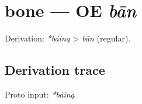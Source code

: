 \documentclass[
  british,
  a4paper,
  openany]{book}
\providecommand{\texorpdfstring}[2]{#1}
\begin{document}
\section{\texorpdfstring{bone --- OE
\emph{bān}}{bone --- OE bān}}\label{bone-oe-bux101n}


Derivation: \emph{*báiną} \textgreater{} \emph{bān} (regular).

\subsection{Derivation trace}\label{derivation-trace-6}

Proto input: \emph{*báiną}

\begingroup
\setlength{\fboxsep}{6pt}
\end{document}
